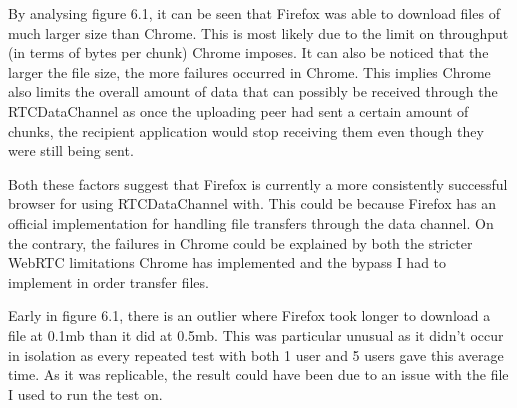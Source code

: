 \documentclass[]{report}
\begin{document}
			By analysing figure 6.1, it can be seen that Firefox was able to download files of much larger size than Chrome. This is most likely due to the limit on throughput (in terms of bytes per chunk) Chrome imposes. It can also be noticed that the larger the file size, the more failures occurred in Chrome. This implies Chrome also limits the overall amount of data that can possibly be received through the RTCDataChannel as once the uploading peer had sent a certain amount of chunks, the recipient application would stop receiving them even though they were still being sent. 
			
			Both these factors suggest that Firefox is currently a more consistently successful browser for using RTCDataChannel with. This could be because Firefox has an official implementation for handling file transfers through the data channel. On the contrary, the failures in Chrome could be explained by both the stricter WebRTC limitations Chrome has implemented and the bypass I had to implement in order transfer files.
			
			Early in figure 6.1, there is an outlier where Firefox took longer to download a file at 0.1mb than it did at 0.5mb. This was particular unusual as it didn't occur in isolation as every repeated test with both 1 user and 5 users gave this average time. As it was replicable, the result could have been due to an issue with the file I used to run the test on.
	
\end{document}
